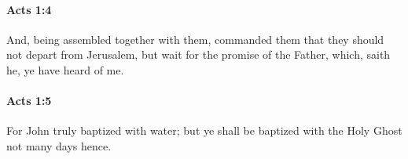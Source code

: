 		\paragraph{Acts 1:4} %
			\label{ACTS-1-4}

			And, being assembled together with them, commanded them that they should not depart from Jerusalem, but wait for the promise of the Father, which, saith he, ye have heard of me.

			\begin{framed}
			\scriptsize
				\begin{compactdesc}
					\item[SBLG] 
				\end{compactdesc}
			\end{framed}

		\paragraph{Acts 1:5} %
			\label{ACTS-1-5}

			For John truly baptized with water; but ye shall be baptized with the Holy Ghost not many days hence.

